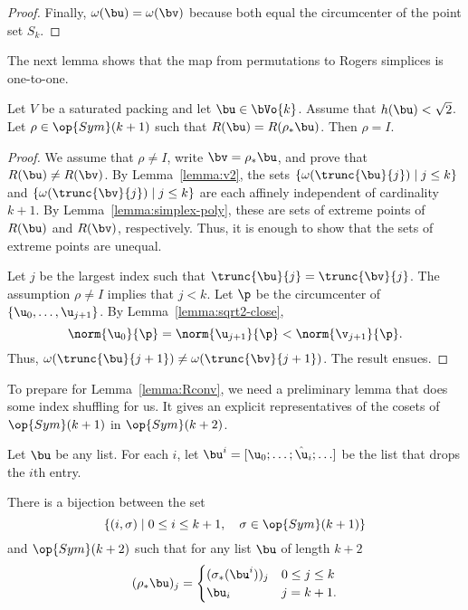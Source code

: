 \begin{cnl}
\begin{proof}
Finally, $\omega(\bu) = \omega(\bv)$ because both equal the
circumcenter of the point set $S_k$.
\end{proof}

The next lemma shows that the map from permutations to Rogers
simplices is one-to-one.

\begin{lemma}
\label{lemma:permutations-one-to-one}
%
  Let $V$ be a saturated packing and let $\bu\in \bVo{k}$.  Assume that
  $h(\bu)<\sqrt2$.  Let $\rho\in\op{Sym}(k+1)$ such that $R(\bu)=
  R(\rho_*\bu)$.  Then $\rho= I$.
\end{lemma}

\begin{proof} 
  We assume that $\rho\ne I$, write $\bv = \rho_*\bu$,  and prove that
  $R(\bu)\ne R(\bv)$.
  By Lemma~\ref{lemma:v2}, the sets
  $\setcomp{\omega(\trunc{\bu}{j})}{ j\le k}$ and
  $\setcomp{\omega(\trunc{\bv}{j})}{ j\le k}$ are each affinely
  independent of cardinality $k+1$.  By
  Lemma~\ref{lemma:simplex-poly}, these are  sets of extreme
  points of $R(\bu)$ and $R(\bv)$, respectively.  Thus, it is enough
  to show that the sets of extreme points are unequal.

  Let $j$ be the largest index such that
  $\trunc{\bu}{j}=\trunc{\bv}{j}$.  The assumption $\rho\ne I$ implies
  that $j<k$.  Let $\p$ be the circumcenter of
  $\setenumdots{\u}{0}{j+1}$.  By Lemma~\ref{lemma:sqrt2-close},
\[  
\norm{\u_0}{\p} = \norm{\u_{j+1}}{\p} < \norm{\v_{j+1}}{\p}.
\] 
Thus, $\omega(\trunc{\bu}{j+1}) \ne \omega(\trunc{\bv}{j+1})$.  The result ensues.
\end{proof}

To prepare for Lemma~\ref{lemma:Rconv}, we need a preliminary lemma
that does some index shuffling for us.  It gives an explicit
representatives of the cosets of $\op{Sym}(k+1)$ in $\op{Sym}(k+2)$.


\begin{definition}
\label{def:bui}
%
Let $\bu$ be any list.  For each $i$, let $\bu^i =
[\u_0;\ldots;\hat\u_i;\ldots]$ be the list that drops the $i$th entry.
\end{definition}

\begin{lemma}
\label{lemma:coset-bijection} 
%
There is a bijection between the set 
\[  
\setcomp{(i,\sigma)}{ 0\le i\le k+1,\quad \sigma\in \op{Sym}(k+1)}
\] 
and $\op{Sym}(k+2)$ such that for any list $\bu$ of length $k+2$
\[
(\rho_*\bu)_j = \begin{cases} (\sigma_*(\bu^i))_j&0\le j \le k\\
  \bu_i & j=k+1.
\end{cases}
\]
\end{lemma}


\end{cnl}
